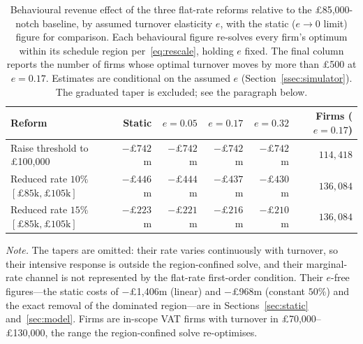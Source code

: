 \begin{table}[htbp]
\centering
\caption{Behavioural revenue effect of the three flat-rate reforms relative to
the \pounds85{,}000-notch baseline, by assumed turnover elasticity $e$, with
the static ($e\to0$ limit) figure for comparison. Each behavioural figure
re-solves every firm's optimum within its schedule region
per~\eqref{eq:rescale}, holding $e$ fixed. The final column reports the
number of firms whose optimal turnover moves by more than \pounds500 at
$e=0.17$. Estimates are conditional
on the assumed $e$ (Section~\ref{ssec:simulator}). The graduated taper is
excluded; see the paragraph below.}
\label{tab:behavioural_costs}
\small
\begin{tabular}{@{}lrrrrr@{}}
\toprule
Reform & Static & $e=0.05$ & $e=0.17$ & $e=0.32$ & Firms ($e{=}0.17$) \\
\midrule
Raise threshold to \pounds100{,}000
  & $-\pounds742$m & $-\pounds742$m & $-\pounds742$m & $-\pounds742$m & $114{,}418$ \\
Reduced rate $10\%$ $[\pounds85\text{k},\pounds105\text{k}]$
  & $-\pounds446$m & $-\pounds444$m & $-\pounds437$m & $-\pounds430$m & $136{,}084$ \\
Reduced rate $15\%$ $[\pounds85\text{k},\pounds105\text{k}]$
  & $-\pounds223$m & $-\pounds221$m & $-\pounds216$m & $-\pounds210$m & $136{,}084$ \\
\bottomrule
\end{tabular}

\smallskip
{\footnotesize \emph{Note.} The tapers are omitted: their rate varies
continuously with turnover, so their intensive response is outside the
region-confined solve, and their marginal-rate channel is not represented by
the flat-rate first-order condition. Their $e$-free figures---the static costs
of \(-\)\pounds1{,}406m (linear) and \(-\)\pounds968m (constant $50\%$) and the exact
removal of the dominated region---are in Sections~\ref{sec:static}
and~\ref{sec:model}. Firms are in-scope VAT firms with turnover in
\pounds70{,}000--\pounds130{,}000, the range the region-confined solve
re-optimises.}
\end{table}

